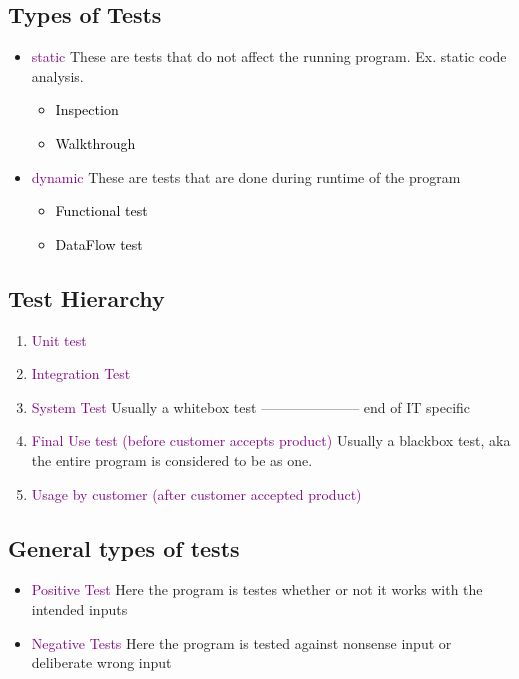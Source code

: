 \documentclass[main.tex,fontsize=12pt,paper=a4,paper=landscape,DIV=calc,]{scrartcl}
\begin{document}
\begin{multicols*}{2}
\subsection{Types of Tests}
\begin{itemize}
\item \textcolor{purple}{static}\newline
  These are tests that do not affect the running program.\newline
  Ex. static code analysis.\newline
  \begin{itemize}
  \item \textcolor{black}{Inspection}
  \item \textcolor{black}{Walkthrough}
  \end{itemize} 
\item \textcolor{purple}{dynamic}\newline
  These are tests that are done during runtime of the program\newline
  \begin{itemize}
  \item \textcolor{black}{Functional test}
  \item \textcolor{black}{DataFlow test}
  \end{itemize} 
\end{itemize} 

\subsection{Test Hierarchy} 
\begin{enumerate}
\item \textcolor{purple}{Unit test}
\item \textcolor{purple}{Integration Test}
\item \textcolor{purple}{System Test}\newline
  Usually a whitebox test\newline
  --------------------- end of IT specific
\item \textcolor{purple}{Final Use test (before customer accepts product)}\newline
  Usually a blackbox test, aka the entire program is considered to be as one.
\item \textcolor{purple}{Usage by customer (after customer accepted product)}
\end{enumerate} 

\subsection{General types of tests}
\begin{itemize}
\item \textcolor{purple}{Positive Test}\newline
  Here the program is testes whether or not it works with the intended inputs
\item \textcolor{purple}{Negative Tests}\newline
  Here the program is tested against nonsense input or deliberate wrong input
\end{itemize} 


\end{multicols*}
\end{document}
